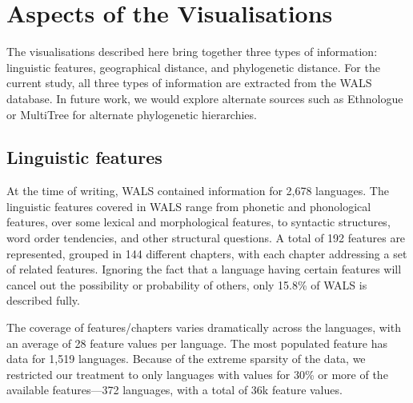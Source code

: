 \documentclass[11pt]{article}
\begin{document}
\section{Aspects of the Visualisations}

The visualisations described here bring together three types of information: linguistic features, geographical distance, and phylogenetic distance. For the current study, all three types of information are extracted from the WALS database. In future work, we would explore alternate sources such as Ethnologue \cite{ethnologue} or MultiTree  for alternate phylogenetic hierarchies. 

\subsection{Linguistic features}
At the time of writing, WALS contained information for 2,678 languages. The linguistic features covered in WALS range from phonetic and phonological features, over some lexical and morphological features, to syntactic structures, word order tendencies, and other structural questions. A total of 192 features are represented, grouped in 144 different chapters, with each chapter addressing a set of related features.  Ignoring the fact that a language having certain features will cancel out the possibility or probability of others, only 15.8\% of WALS is described fully.

The coverage of features/chapters varies dramatically across the languages, with an average of 28 feature values per language. The most populated feature has data for 1,519 languages. Because of the extreme sparsity of the data, we restricted our treatment to only languages with values for 30\% or more of the available features---372 languages, with a total of 36k feature values.
\end{document}
